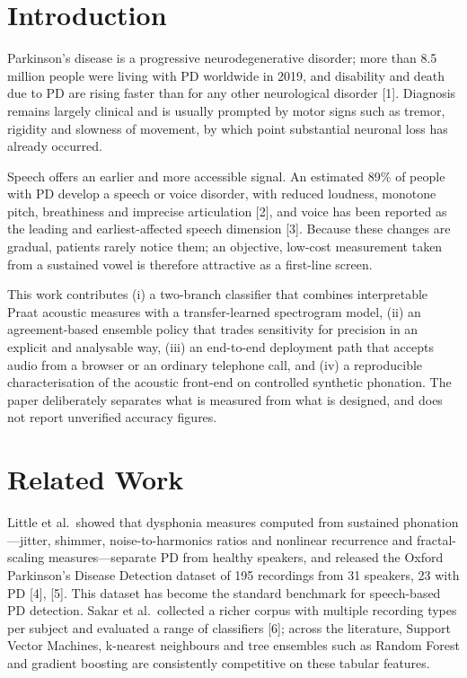 \section{Introduction}
Parkinson's disease is a progressive neurodegenerative disorder; more than 8.5 million people were living with PD worldwide in 2019, and disability and death due to PD are rising faster than for any other neurological disorder [1]. Diagnosis remains largely clinical and is usually prompted by motor signs such as tremor, rigidity and slowness of movement, by which point substantial neuronal loss has already occurred.

Speech offers an earlier and more accessible signal. An estimated 89\% of people with PD develop a speech or voice disorder, with reduced loudness, monotone pitch, breathiness and imprecise articulation [2], and voice has been reported as the leading and earliest-affected speech dimension [3]. Because these changes are gradual, patients rarely notice them; an objective, low-cost measurement taken from a sustained vowel is therefore attractive as a first-line screen.

This work contributes (i) a two-branch classifier that combines interpretable Praat acoustic measures with a transfer-learned spectrogram model, (ii) an agreement-based ensemble policy that trades sensitivity for precision in an explicit and analysable way, (iii) an end-to-end deployment path that accepts audio from a browser or an ordinary telephone call, and (iv) a reproducible characterisation of the acoustic front-end on controlled synthetic phonation. The paper deliberately separates what is measured from what is designed, and does not report unverified accuracy figures.

\section{Related Work}
Little et al.\ showed that dysphonia measures computed from sustained phonation---jitter, shimmer, noise-to-harmonics ratios and nonlinear recurrence and fractal-scaling measures---separate PD from healthy speakers, and released the Oxford Parkinson's Disease Detection dataset of 195 recordings from 31 speakers, 23 with PD [4], [5]. This dataset has become the standard benchmark for speech-based PD detection. Sakar et al.\ collected a richer corpus with multiple recording types per subject and evaluated a range of classifiers [6]; across the literature, Support Vector Machines, k-nearest neighbours and tree ensembles such as Random Forest and gradient boosting are consistently competitive on these tabular features.

